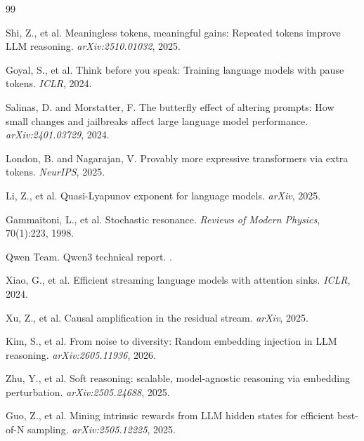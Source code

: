 \documentclass{article}
\begin{document}

\begin{thebibliography}{99}

Shi, Z., et al.
\newblock Meaningless tokens, meaningful gains: Repeated tokens improve LLM reasoning.
\newblock \emph{arXiv:2510.01032}, 2025.

Goyal, S., et al.
\newblock Think before you speak: Training language models with pause tokens.
\newblock \emph{ICLR}, 2024.

Salinas, D. and Morstatter, F.
\newblock The butterfly effect of altering prompts: How small changes and jailbreaks affect large language model performance.
\newblock \emph{arXiv:2401.03729}, 2024.

London, B. and Nagarajan, V.
\newblock Provably more expressive transformers via extra tokens.
\newblock \emph{NeurIPS}, 2025.

Li, Z., et al.
\newblock Quasi-Lyapunov exponent for language models.
\newblock \emph{arXiv}, 2025.

Gammaitoni, L., et al.
\newblock Stochastic resonance.
\newblock \emph{Reviews of Modern Physics}, 70(1):223, 1998.

Qwen Team.
\newblock Qwen3 technical report.
.

Xiao, G., et al.
\newblock Efficient streaming language models with attention sinks.
\newblock \emph{ICLR}, 2024.

Xu, Z., et al.
\newblock Causal amplification in the residual stream.
\newblock \emph{arXiv}, 2025.

Kim, S., et al.
\newblock From noise to diversity: Random embedding injection in LLM reasoning.
\newblock \emph{arXiv:2605.11936}, 2026.

Zhu, Y., et al.
\newblock Soft reasoning: scalable, model-agnostic reasoning via embedding perturbation.
\newblock \emph{arXiv:2505.24688}, 2025.

Guo, Z., et al.
\newblock Mining intrinsic rewards from LLM hidden states for efficient best-of-N sampling.
\newblock \emph{arXiv:2505.12225}, 2025.

\end{thebibliography}
\end{document}
